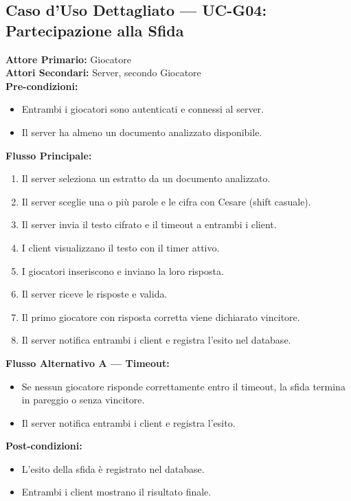 \documentclass[12pt, a4paper]{article}
\begin{document}
\subsection{Caso d'Uso Dettagliato — UC-G04: Partecipazione alla Sfida}

\begin{tcolorbox}[colback=lightGray, colframe=darkGray!60, title=\textbf{UC-G04 — Partecipazione alla Sfida}]
\textbf{Attore Primario:} Giocatore\\
\textbf{Attori Secondari:} Server, secondo Giocatore\\[0.3cm]
\textbf{Pre-condizioni:}
\begin{itemize}
    \item Entrambi i giocatori sono autenticati e connessi al server.
    \item Il server ha almeno un documento analizzato disponibile.
\end{itemize}
\textbf{Flusso Principale:}
\begin{enumerate}
    \item Il server seleziona un estratto da un documento analizzato.
    \item Il server sceglie una o più parole e le cifra con Cesare (shift casuale).
    \item Il server invia il testo cifrato e il timeout a entrambi i client.
    \item I client visualizzano il testo con il timer attivo.
    \item I giocatori inseriscono e inviano la loro risposta.
    \item Il server riceve le risposte e valida.
    \item Il primo giocatore con risposta corretta viene dichiarato vincitore.
    \item Il server notifica entrambi i client e registra l'esito nel database.
\end{enumerate}
\textbf{Flusso Alternativo A — Timeout:}
\begin{itemize}
    \item Se nessun giocatore risponde correttamente entro il timeout, la sfida termina in pareggio o senza vincitore.
    \item Il server notifica entrambi i client e registra l'esito.
\end{itemize}
\textbf{Post-condizioni:}
\begin{itemize}
    \item L'esito della sfida è registrato nel database.
    \item Entrambi i client mostrano il risultato finale.
\end{itemize}
\end{tcolorbox}
\end{document}
